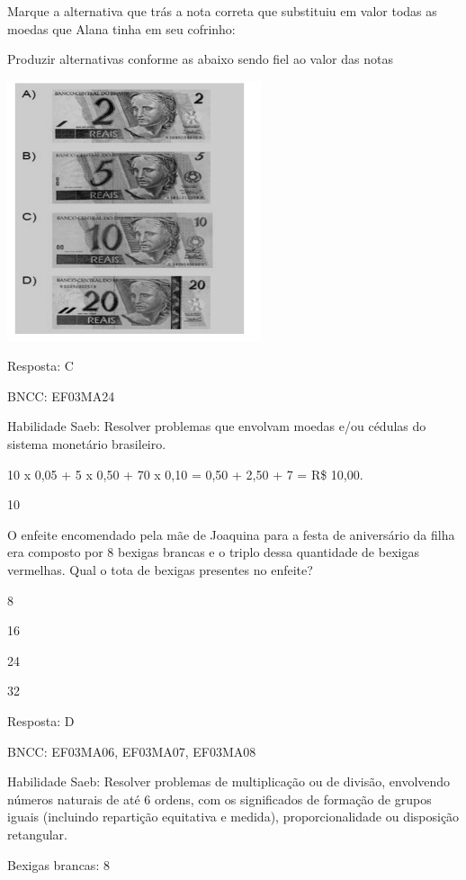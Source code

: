 \begin{escolha}
{\begin{escolha}
{Marque a alternativa que trás a nota correta que substituiu em valor
todas as moedas que Alana tinha em seu cofrinho:

Produzir alternativas conforme as abaixo sendo fiel ao valor das notas

\includegraphics[width=2.93590in,height=3.00930in]{media/image135.png}

Resposta: C

BNCC: EF03MA24

Habilidade Saeb: Resolver problemas que envolvam moedas e/ou cédulas do
sistema monetário brasileiro.

10 x 0,05 + 5 x 0,50 + 70 x 0,10 = 0,50 + 2,50 + 7 = R\$ 10,00.

\num{10}

O enfeite encomendado pela mãe de Joaquina para a festa de aniversário
da filha era composto por 8 bexigas brancas e o triplo dessa quantidade
de bexigas vermelhas. Qual o tota de bexigas presentes no enfeite?

\begin{escolha}

\item
  8
\item
  16
\item
  24
\item
  32
\end{escolha}

Resposta: D

BNCC: EF03MA06, EF03MA07, EF03MA08

Habilidade Saeb: Resolver problemas de multiplicação ou de divisão,
envolvendo números naturais de até 6 ordens, com os significados de
formação de grupos iguais (incluindo repartição equitativa e medida),
proporcionalidade ou disposição retangular.

Bexigas brancas: 8

}
\end{escolha}}
\end{escolha}
